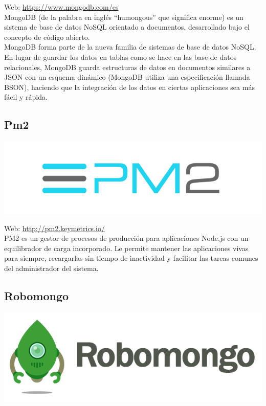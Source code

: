 Web: \url{https://www.mongodb.com/es}\\

MongoDB (de la palabra en inglés “humongous” que significa enorme) es un sistema de base de datos NoSQL orientado a documentos, desarrollado bajo el concepto de código abierto.\\

MongoDB forma parte de la nueva familia de sistemas de base de datos NoSQL. En lugar de guardar los datos en tablas como se hace en las base de datos relacionales, MongoDB guarda estructuras de datos en documentos similares a JSON con un esquema dinámico (MongoDB utiliza una especificación llamada BSON), haciendo que la integración de los datos en ciertas aplicaciones sea más fácil y rápida.\\



\subsection{Pm2}

\begin{center}
\includegraphics[scale=0.5]{imagenes/pm2-logo.png}
\end{center}

Web: \url{http://pm2.keymetrics.io/}\\


PM2 es un gestor de procesos de producción para aplicaciones Node.js con un equilibrador de carga incorporado. Le permite mantener las aplicaciones vivas para siempre, recargarlas sin tiempo de inactividad
y facilitar las tareas comunes del administrador del sistema.


\subsection{ Robomongo }

\begin{center}
\includegraphics[scale=0.5]{imagenes/robomongo-logo.png}
\end{center}

